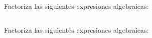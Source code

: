 \documentclass[12pt,addpoints]{evalua}
\begin{document}
\begin{questions}
      \subsection*{\else{}\fi}
      \question[4] Factoriza las siguientes expresiones algebraicas:
      \begin{multicols}{2}
      \end{multicols}


      \subsection*{\else{}\fi}
      \question[4] Factoriza las siguientes expresiones algebraicas:
      \begin{multicols}{2}
            \begin{parts}

\end{parts}
\end{multicols}
\end{questions}
\end{document}
